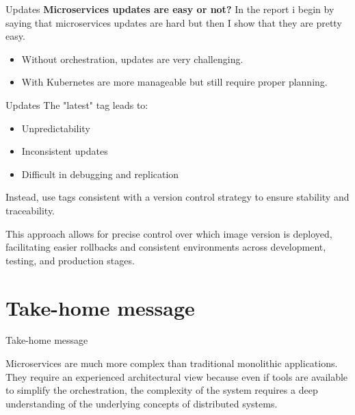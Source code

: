 \documentclass{beamer}
\begin{document}
\begin{frame}{Updates}
	\textbf{Microservices updates are easy or not?}
	In the report i begin by saying that microservices updates are hard but then I show that they are pretty easy.
	\begin{itemize}
		\item Without orchestration, updates are very challenging.
		\item With Kubernetes are more manageable but still require proper planning.
	\end{itemize}
\end{frame}
\begin{frame}{Updates}
	The "latest" tag leads to:
	\begin{itemize}
		\item Unpredictability
		\item Inconsistent updates
		\item Difficult in debugging and replication
	\end{itemize}
	\begin{block}{}
		Instead, use tags consistent with a version control strategy to ensure stability and traceability.
	\end{block}
	This approach allows for precise control over which image version is deployed, facilitating easier rollbacks and consistent environments across development, testing, and production stages.
\end{frame}

\section{Take-home message}
\begin{frame}{Take-home message}
	\begin{block}{}
		Microservices are much more complex than traditional monolithic applications. They require an experienced architectural view because even if tools are available to simplify the orchestration, the complexity of the system requires a deep understanding of the underlying concepts of distributed systems.
	\end{block}
\end{frame}
\end{document}
